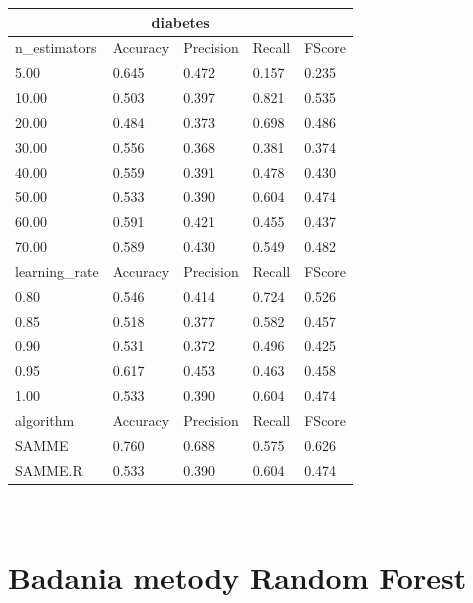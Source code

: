 \documentclass[12pt,a4paper]{article}
\begin{document}
\begin{tabular}{ |p{3cm}||p{2cm}|p{2cm}|p{2cm}|p{2cm}| }
\hline
\multicolumn{5}{|c|}{diabetes}\\
\hline
n\_estimators & Accuracy & Precision & Recall & FScore \\
\hline
5.00 & 0.645 & 0.472 & 0.157 & 0.235\\
10.00 & 0.503 & 0.397 & 0.821 & 0.535\\
20.00 & 0.484 & 0.373 & 0.698 & 0.486\\
30.00 & 0.556 & 0.368 & 0.381 & 0.374\\
40.00 & 0.559 & 0.391 & 0.478 & 0.430\\
50.00 & 0.533 & 0.390 & 0.604 & 0.474\\
60.00 & 0.591 & 0.421 & 0.455 & 0.437\\
70.00 & 0.589 & 0.430 & 0.549 & 0.482\\
\hline
learning\_rate & Accuracy & Precision & Recall & FScore \\
\hline
0.80 & 0.546 & 0.414 & 0.724 & 0.526\\
0.85 & 0.518 & 0.377 & 0.582 & 0.457\\
0.90 & 0.531 & 0.372 & 0.496 & 0.425\\
0.95 & 0.617 & 0.453 & 0.463 & 0.458\\
1.00 & 0.533 & 0.390 & 0.604 & 0.474\\
\hline
algorithm & Accuracy & Precision & Recall & FScore \\
\hline
SAMME & 0.760 & 0.688 & 0.575 & 0.626\\
SAMME.R & 0.533 & 0.390 & 0.604 & 0.474\\
\hline
\end{tabular}
\\
\section{Badania metody Random Forest}
\end{document}
